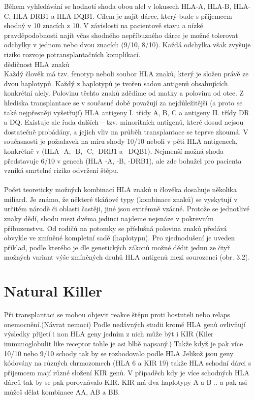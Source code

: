 \documentclass[czech,DP]{thesiskiv}
\begin{document}
Během vyhledávání se hodnotí shoda obou alel v lokusech HLA-A, HLA-B, HLA-C,
HLA-DRB1 a HLA-DQB1. Cílem je najít dárce, který bude s příjemcem shodný v 10 znacích
z 10. V závislosti na pacientově stavu a nízké pravděpodobnosti najít včas shodného
nepříbuzného dárce je možné tolerovat odchylky v jednom nebo dvou znacích (9/10,
8/10). Každá odchylka však zvyšuje riziko rozvoje potransplantačních komplikací.
\\
dědičnost HLA znaků
\\
Každý člověk má tzv. fenotyp neboli soubor HLA znaků, který je složen právě
ze dvou haplotypů. Každý z haplotypů je tvořen sadou antigenů obsahujících konkrétní
alely. Polovinu těchto znaků zdědíme od matky a polovinu od otce.
Z hlediska transplantace se v současné době považují za nejdůležitější (a proto
se také nejpřesněji vyšetřují) HLA antigeny I. třídy A, B, C a antigeny II. třídy DR a
DQ. Existuje ale řada dalších – tzv. minoritních antigenů, které dosud nejsou
dostatečně probádány, a jejich vliv na průběh transplantace se teprve zkoumá.
V současnosti je požadavek na míru shody 10/10 neboli v pěti HLA antigenech,
konkrétně v (HLA -A, -B, -C, -DRB1 a –DQB1). Nejmenší možná shoda představuje
6/10 v genech (HLA -A, -B, -DRB1), ale zde bohužel pro pacienta vzniká smrtelné
riziko odvržení štěpu.
\\
\\
Počet teoreticky možných kombinací HLA znaků u člověka dosahuje několika
miliard. Je známo, že některé tkáňové typy (kombinace znaků) se vyskytují v určitém
národě či oblasti častěji, jiné jsou extrémně vzácné. Protože se jednotlivé znaky dědí,
shodu mezi dvěma jedinci najdeme nejsnáze v pokrevním příbuzenstvu. Od rodičů na
potomky se příslušná polovina znaků předává obvykle ve zmíněné kompletní sadě
(haplotypu).
Pro zjednodušení je uveden příklad, podle kterého je dle genetických zákonů
možné dědit jednu ze čtyř možných variant výše zmíněných druhů HLA antigenů mezi
sourozenci (obr. 3.2).
\section{Natural Killer}
Při transplantaci se mohou objevit reakce štěpu proti hostuteli nebo relaps onemocnění.(Návrat nemoci)
Podle nedávných studii kromě HLA genů ovlivňují výsledky přijetí i non HLA geny jedním z nich může být i KIR (Kiler immunoglobulit like receptor  tohle je asi blbě napsaný.)
Takže když je pak více 10/10 nebo 9/10 schody tak by se rozhodovalo podle HLA
Jelikož jsou geny kódovány na různých chrmozomech (HLA 6 a KIR 19) takže HLA schodní dárci s příjemcem mají různé složení KIR genů.
V případěch kdy je více schodných HLA dárců tak by se pak porovnávalo KIR.
KIR má dva haplotypy A a B .. a pak asi můžeš dělat kombinace AA, AB a BB.
\end{document}
